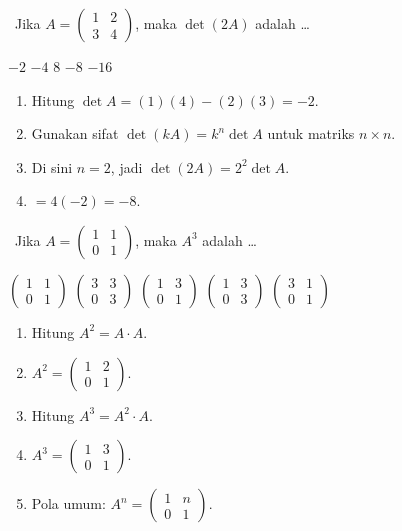 \documentclass[11pt,a4paper]{exam}
\newenvironment{langkah}{%
  \begin{enumerate}[label=\textbf{Langkah \arabic*:},leftmargin=2.6em,
    itemsep=2pt,topsep=2pt]}{\end{enumerate}}
\newcommand{\Adv}{{\footnotesize\textsf{\textcolor{oranye}{[Advanced]}}}\ }
\newcommand{\Exp}{{\footnotesize\textsf{\textcolor{ungu}{[Expert]}}}\ }
\begin{document}
\begin{questions}
\question \Adv Jika $A = \begin{pmatrix} 1 & 2\\ 3 & 4 \end{pmatrix}$, maka $\det(2A)$ adalah \dots
\begin{choices}
\choice $-2$ \choice $-4$ \choice $8$ \CorrectChoice $-8$ \choice $-16$
\end{choices}
\begin{solution}
\begin{langkah}
\item Hitung $\det A = (1)(4)-(2)(3) = -2$.
\item Gunakan sifat $\det(kA) = k^{n}\det A$ untuk matriks $n\times n$.
\item Di sini $n=2$, jadi $\det(2A) = 2^{2}\det A$.
\item $= 4(-2) = -8$.
\end{langkah}
\end{solution}

\question \Exp Jika $A = \begin{pmatrix} 1 & 1\\ 0 & 1 \end{pmatrix}$, maka $A^{3}$ adalah \dots
\begin{choices}
\choice $\begin{pmatrix} 1 & 1\\ 0 & 1 \end{pmatrix}$
\choice $\begin{pmatrix} 3 & 3\\ 0 & 3 \end{pmatrix}$
\CorrectChoice $\begin{pmatrix} 1 & 3\\ 0 & 1 \end{pmatrix}$
\choice $\begin{pmatrix} 1 & 3\\ 0 & 3 \end{pmatrix}$
\choice $\begin{pmatrix} 3 & 1\\ 0 & 1 \end{pmatrix}$
\end{choices}
\begin{solution}
\begin{langkah}
\item Hitung $A^{2} = A\cdot A$.
\item $A^{2} = \begin{pmatrix} 1 & 2\\ 0 & 1 \end{pmatrix}$.
\item Hitung $A^{3} = A^{2}\cdot A$.
\item $A^{3} = \begin{pmatrix} 1 & 3\\ 0 & 1 \end{pmatrix}$.
\item Pola umum: $A^{n} = \begin{pmatrix} 1 & n\\ 0 & 1 \end{pmatrix}$.
\end{langkah}
\end{solution}


\end{questions}
\end{document}
